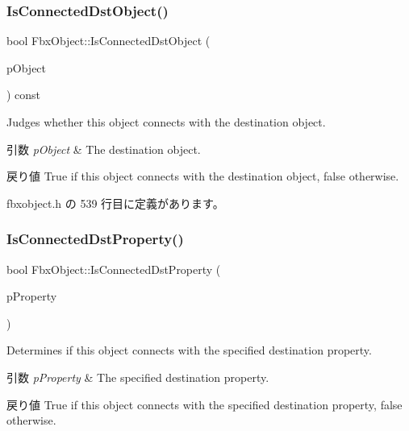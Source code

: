 \subsubsection{\texorpdfstring{Is\+Connected\+Dst\+Object()}{IsConnectedDstObject()}}
{\footnotesize\ttfamily bool Fbx\+Object\+::\+Is\+Connected\+Dst\+Object (\begin{DoxyParamCaption}\item[{const \hyperlink{class_fbx_object}{Fbx\+Object} $\ast$}]{p\+Object }\end{DoxyParamCaption}) const\hspace{0.3cm}{\ttfamily [inline]}}

Judges whether this object connects with the destination object. 
\begin{DoxyParams}{引数}
{\em p\+Object} & The destination object. \\
\hline
\end{DoxyParams}
\begin{DoxyReturn}{戻り値}
{\ttfamily True} if this object connects with the destination object, {\ttfamily false} otherwise. 
\end{DoxyReturn}


 fbxobject.\+h の 539 行目に定義があります。

\mbox{\label{class_fbx_object_a678e5ccdbf6ab28c1df239fbdcea76d3}} 
\subsubsection{\texorpdfstring{Is\+Connected\+Dst\+Property()}{IsConnectedDstProperty()}}
{\footnotesize\ttfamily bool Fbx\+Object\+::\+Is\+Connected\+Dst\+Property (\begin{DoxyParamCaption}\item[{const \hyperlink{class_fbx_property}{Fbx\+Property} \&}]{p\+Property }\end{DoxyParamCaption})\hspace{0.3cm}{\ttfamily [inline]}}

Determines if this object connects with the specified destination property. 
\begin{DoxyParams}{引数}
{\em p\+Property} & The specified destination property. \\
\hline
\end{DoxyParams}
\begin{DoxyReturn}{戻り値}
{\ttfamily True} if this object connects with the specified destination property, {\ttfamily false} otherwise. 
\end{DoxyReturn}


